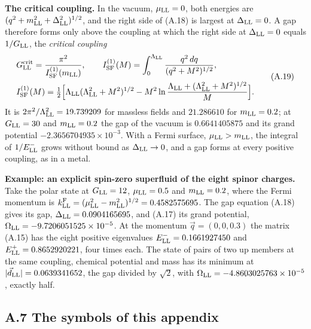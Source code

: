 \documentclass[
  10pt,
]{article}
\begin{document}
\textbf{The critical coupling.} In the vacuum, \(\mu_{\rm LL}=0\), both
energies are \((q^2+m_{\rm LL}^2+\Delta_{\rm LL}^2)^{1/2}\), and the
right side of (A.18) is largest at \(\Delta_{\rm LL}=0\). A gap
therefore forms only above the coupling at which the right side at
\(\Delta_{\rm LL}=0\) equals \(1/G_{\rm LL}\), the \emph{critical
coupling}
\[\begin{aligned}&G^{\rm crit}_{\rm LL}=\frac{\pi^2}{I^{(1)}_{\rm SF}(m_{\rm LL})},\qquad I^{(1)}_{\rm SF}(M)=\int_0^{\Lambda_{\rm LL}}\frac{q^2\,dq}{(q^2+M^2)^{1/2}},\\&I^{(1)}_{\rm SF}(M)=\tfrac12\Big[\Lambda_{\rm LL}(\Lambda_{\rm LL}^2+M^2)^{1/2}-M^2\ln\frac{\Lambda_{\rm LL}+(\Lambda_{\rm LL}^2+M^2)^{1/2}}{M}\Big].\end{aligned}\tag{A.19}\]
It is \(2\pi^2/\Lambda_{\rm LL}^2=19.739209\) for massless fields and
\(21.286610\) for \(m_{\rm LL}=0.2\); at \(G_{\rm LL}=30\) and
\(m_{\rm LL}=0.2\) the gap of the vacuum is \(0.6641405875\) and its
grand potential \(-2.3656704935\times10^{-3}\). With a Fermi surface,
\(\mu_{\rm LL}>m_{\rm LL}\), the integral of \(1/E^-_{\rm LL}\) grows
without bound as \(\Delta_{\rm LL}\to0\), and a gap forms at every
positive coupling, as in a metal.

\textbf{Example: an explicit spin-zero superfluid of the eight spinor
charges.} Take the polar state at \(G_{\rm LL}=12\),
\(\mu_{\rm LL}=0.5\) and \(m_{\rm LL}=0.2\), where the Fermi momentum is
\(k^{\rm F}_{\rm LL}=(\mu_{\rm LL}^2-m_{\rm LL}^2)^{1/2}=0.4582575695\).
The gap equation (A.18) gives its gap, \(\Delta_{\rm LL}=0.0904165695\),
and (A.17) its grand potential,
\(\Omega_{\rm LL}=-9.7206051525\times10^{-5}\). At the momentum
\(\vec q=(0,0,0.3)\) the matrix (A.15) has the eight positive
eigenvalues \(E^-_{\rm LL}=0.1661927450\) and
\(E^+_{\rm LL}=0.8652920221\), four times each. The state of pairs of
two up members at the same coupling, chemical potential and mass has its
minimum at \(|\vec d_{\rm LL}|=0.0639341652\), the gap divided by
\(\sqrt2\), with \(\Omega_{\rm LL}=-4.8603025763\times10^{-5}\), exactly
half.

\hypertarget{a.7-the-symbols-of-this-appendix}{%
\subsection{A.7 The symbols of this
appendix}\label{a.7-the-symbols-of-this-appendix}}
\end{document}
